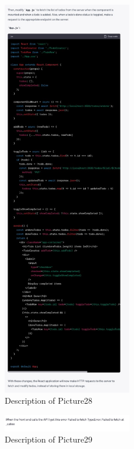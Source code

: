 \documentclass[runningheads]{llncs}
\begin{document}
\begin{figure}[h]
    \centering
    \includegraphics[width=0.5\textwidth]{Pictures/Picture28.jpg}
    \caption{Description of Picture28}
    \label{fig:picture28}
\end{figure}
\begin{figure}[h]
    \centering
    \includegraphics[width=0.5\textwidth]{Pictures/Picture29.jpg}
    \caption{Description of Picture29}
    \label{fig:picture29}
\end{figure}
\end{document}
